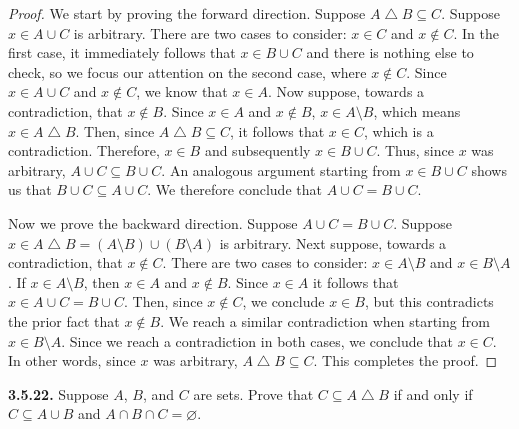 \documentclass[12pt]{amsart}
\newenvironment{statement}[1]{\smallskip\noindent\color[rgb]{.6627, .3529, .6314} {\bf #1.}}{}
\theoremstyle{definition}
\theoremstyle{remark}
\begin{document}
\begin{proof}
We start by proving the forward direction.
Suppose $A \bigtriangleup B \subseteq C$.
Suppose $x \in A \cup C$ is arbitrary.
There are two cases to consider: $x \in C$ and $x \notin C$.
In the first case, it immediately follows that $x \in B \cup C$ and there is nothing else to check, so we focus our attention on the second case, where $x \notin C$.
Since $x \in A \cup C$ and $x \notin C$, we know that $x \in A$.
Now suppose, towards a contradiction, that $x \notin B$.
Since $x \in A$ and $x \notin B$, $x \in A \setminus B$, which means $x \in A \bigtriangleup B$.
Then, since $A \bigtriangleup B \subseteq C$, it follows that $x \in C$, which is a contradiction.
Therefore, $x \in B$ and subsequently $x \in B \cup C$.
Thus, since $x$ was arbitrary, $A \cup C \subseteq B \cup C$.
An analogous argument starting from $x \in B \cup C$ shows us that $B \cup C \subseteq A \cup C$.
We therefore conclude that $A \cup C = B \cup C$.

Now we prove the backward direction.
Suppose $A \cup C = B \cup C$.
Suppose $x \in A \bigtriangleup B = (A \setminus B) \cup (B \setminus A)$ is arbitrary.
Next suppose, towards a contradiction, that $x \notin C$.
There are two cases to consider: $x \in A \setminus B$ and $x \in B \setminus A$.
If $x \in A \setminus B$, then $x \in A$ and $x \notin B$.
Since $x \in A$ it follows that $x \in A \cup C = B \cup C$.
Then, since $x \notin C$, we conclude $x \in B$, but this contradicts the prior fact that $x \notin B$.
We reach a similar contradiction when starting from $x \in B \setminus A$.
Since we reach a contradiction in both cases, we conclude that $x \in C$.
In other words, since $x$ was arbitrary, $A \bigtriangleup B \subseteq C$.
This completes the proof.
\end{proof}


\begin{statement}{3.5.22}
Suppose $A$, $B$, and $C$ are sets.
Prove that $C \subseteq A \bigtriangleup B$ if and only if $C \subseteq A \cup B$ and $A \cap B \cap C = \varnothing$.
\end{statement}
\end{document}
